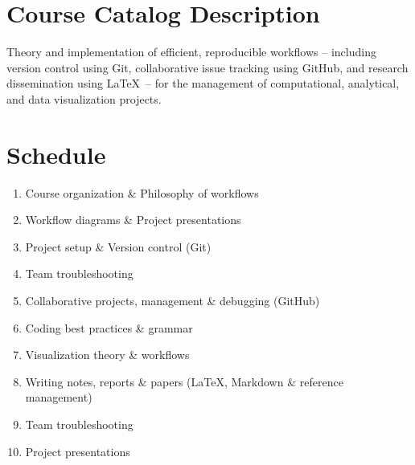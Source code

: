 \documentclass[10pt]{article}
\begin{document}
\section*{Course Catalog Description}
Theory and implementation of efficient, reproducible workflows -- including version control using Git, collaborative issue tracking using GitHub, and research dissemination using \LaTeX\ --  for the management of computational, analytical, and data visualization projects.

\section*{Schedule}
\begin{enumerate}[label=\bfseries Week \arabic*:,leftmargin=*,labelindent=1em]
	\item  Course organization \& Philosophy of workflows
	\item Workflow diagrams \& Project presentations
	\item Project setup \& Version control (Git)
	\item Team troubleshooting
	\item Collaborative projects, management \& debugging (GitHub)
	\item Coding best practices \& grammar
	\item Visualization theory \& workflows
	\item Writing notes, reports \& papers (\LaTeX, Markdown \& reference management)
	\item Team troubleshooting
	\item Project presentations
\end{enumerate}
\end{document}
